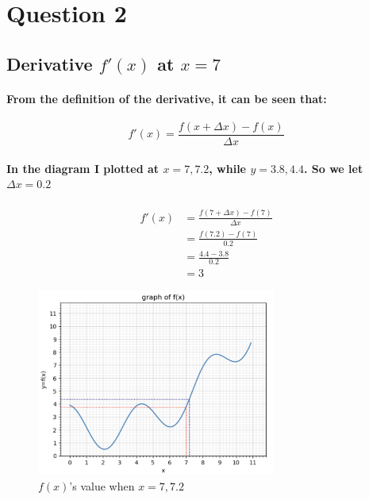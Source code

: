 \section{Question 2}
% 
% 
% 
\subsection{Derivative $f'(x)$ at $x = 7$}
% 
\paragraph{From the definition of the derivative, it can be seen that:}
% 
\begin{equation}
    f'(x)=\frac{f(x + \Delta x)-f(x)}{\Delta x}
\end{equation}
% 
% 
\paragraph{In the diagram I plotted at $x=7,7.2$, while $y=3.8,4.4$. So we let $\Delta x=0.2$}
% 
% 
% 
% 

\begin{align*}
    f'(x)
     & = \frac{f(7+\Delta x)-f(7)}{\Delta x} \\
     & = \frac{f(7.2)-f(7)}{0.2}             \\
     & = \frac{4.4-3.8}{0.2}                 \\
     & =3
\end{align*}

% 
% 
% 
% 
% 
\begin{figure}[H]
    \centering
    \includegraphics[width=0.7\textwidth]{pic/q2a.jpeg}
    \caption{$f(x)$'s value when $x=7,7.2$}
\end{figure}
% 
% 
% 
% 
% 
% 
% 
% 
% 
% 
% 
% 
% 
% 
% 
% 
% 
